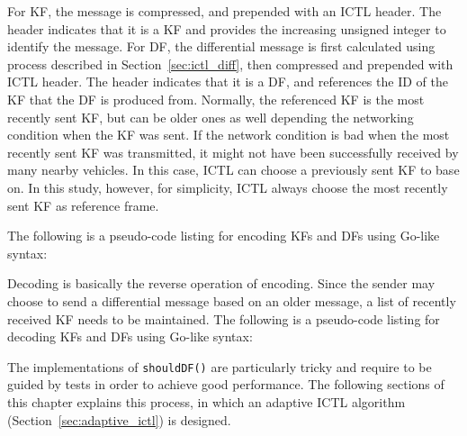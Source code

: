 \documentclass[12pt]{report}
\begin{document}
For KF, the message is compressed, and prepended with an ICTL header. The header indicates that it is a KF and provides the increasing unsigned integer to identify the message. For DF, the differential message is first calculated using process described in Section~\ref{sec:ictl_diff}, then compressed and prepended with ICTL header. The header indicates that it is a DF, and references the ID of the KF that the DF is produced from. Normally, the referenced KF is the most recently sent KF, but can be older ones as well depending the networking condition when the KF was sent. If the network condition is bad when the most recently sent KF was transmitted, it might not have been successfully received by many nearby vehicles. In this case, ICTL can choose a previously sent KF to base on. In this study, however, for simplicity, ICTL always choose the most recently sent KF as reference frame.

The following is a pseudo-code listing for encoding KFs and DFs using Go-like syntax:

\begin{singlespace}
  
\end{singlespace}

Decoding is basically the reverse operation of encoding. Since the sender may choose to send a differential message based on an older message, a list of recently received KF needs to be maintained. The following is a pseudo-code listing for decoding KFs and DFs using Go-like syntax:

\begin{singlespace}
  
\end{singlespace}

The implementations of \texttt{shouldDF()} are particularly tricky and require to be guided by tests in order to achieve good performance. The following sections of this chapter explains this process, in which an adaptive ICTL algorithm (Section~\ref{sec:adaptive_ictl}) is designed.
\end{document}
